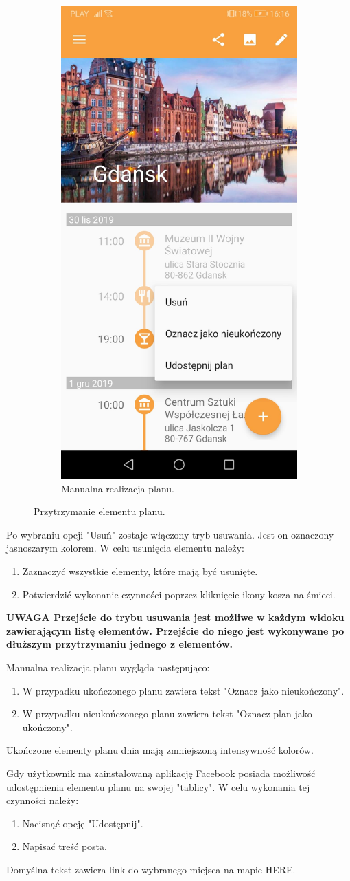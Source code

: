 \documentclass[10pt,twoside,a4paper]{report}
\begin{document}
\begin{figure}[h]
\begin{subfigure}{0.3\textwidth}
\centering
\includegraphics[width=0.8\linewidth, width=4.5cm]{popUpMenu}
\caption{Manualna realizacja planu.}
\label{fig:popUpMenu}
\end{subfigure}
\caption{Przytrzymanie elementu planu.}
\label{fig:podrecznik5}
\end{figure}
\FloatBarrier


Po wybraniu opcji "Usuń" zostaje włączony tryb usuwania.
Jest on oznaczony jasnoszarym kolorem.
W celu usunięcia elementu należy:
\begin{enumerate}
\item Zaznaczyć wszystkie elementy, które mają być usunięte.
\item Potwierdzić wykonanie czynności poprzez kliknięcie ikony kosza na śmieci.
\end{enumerate}
\textbf{UWAGA Przejście do trybu usuwania jest możliwe w każdym widoku zawierającym listę elementów. Przejście do niego jest wykonywane po dłuższym przytrzymaniu jednego z elementów.}



\par Manualna realizacja planu wygląda następująco:
\begin{enumerate}
\item W przypadku ukończonego planu zawiera tekst "Oznacz jako nieukończony".
\item W przypadku nieukończonego planu zawiera tekst "Oznacz plan jako ukończony".
\end{enumerate}
Ukończone elementy planu dnia mają zmniejszoną intensywność kolorów.


\par Gdy użytkownik ma zainstalowaną aplikację Facebook posiada możliwość udostępnienia elementu planu na swojej "tablicy". W celu wykonania tej czynności należy:
\begin{enumerate}
\item Nacisnąć opcję "Udostępnij".
\item Napisać treść posta.
\end{enumerate}
Domyślna tekst zawiera link do wybranego miejsca na mapie HERE.
\end{document}
